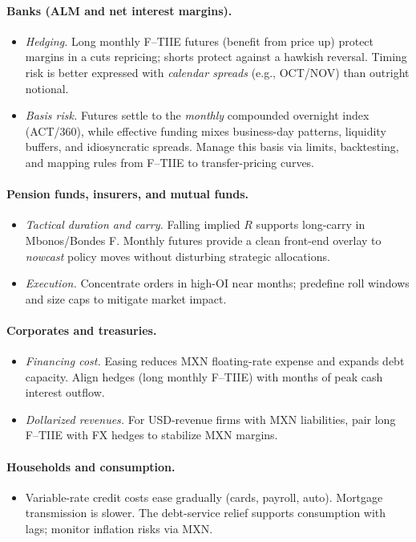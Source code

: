 \documentclass[11pt,a4paper]{article} %
\begin{document}
\paragraph{Banks (ALM and net interest margins).}
\begin{itemize}
  \item \textit{Hedging.} Long monthly F--TIIE futures (benefit from price up) protect margins in a cuts repricing; shorts protect against a hawkish reversal. Timing risk is better expressed with \emph{calendar spreads} (e.g., OCT/NOV) than outright notional.
  \item \textit{Basis risk.} Futures settle to the \emph{monthly} compounded overnight index (ACT/360), while effective funding mixes business-day patterns, liquidity buffers, and idiosyncratic spreads. Manage this basis via limits, backtesting, and mapping rules from F--TIIE to transfer-pricing curves.
\end{itemize}

\paragraph{Pension funds, insurers, and mutual funds.}
\begin{itemize}
  \item \textit{Tactical duration and carry.} Falling implied $R$ supports long-carry in Mbonos/Bondes F. Monthly futures provide a clean front-end overlay to \emph{nowcast} policy moves without disturbing strategic allocations.
  \item \textit{Execution.} Concentrate orders in high-OI near months; predefine roll windows and size caps to mitigate market impact.
\end{itemize}

\paragraph{Corporates and treasuries.}
\begin{itemize}
  \item \textit{Financing cost.} Easing reduces MXN floating-rate expense and expands debt capacity. Align hedges (long monthly F--TIIE) with months of peak cash interest outflow.
  \item \textit{Dollarized revenues.} For USD-revenue firms with MXN liabilities, pair long F--TIIE with FX hedges to stabilize MXN margins.
\end{itemize}

\paragraph{Households and consumption.}
\begin{itemize}
  \item Variable-rate credit costs ease gradually (cards, payroll, auto). Mortgage transmission is slower. The debt-service relief supports consumption with lags; monitor inflation risks via MXN.
\end{itemize}
\end{document}
